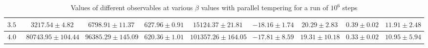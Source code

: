 \begin{sidewaystable}[t!]
\begin{tabular}{|c|c|c|c|c|c|c|c|c|}
            \hline
            $3.50$ & $3217.54 \pm 4.82$ & $6798.91 \pm 11.37$ & $627.96 \pm 0.91$ & $15124.37 \pm 21.81$ & $-18.16 \pm 1.74$ & $20.29 \pm 2.83$ & $0.39 \pm 0.02$ & $11.91 \pm 2.48$ \\
            \hline
            $4.00$ & $80743.95 \pm 104.44$ & $96385.29 \pm 145.09$ & $620.36 \pm 1.01$ & $101357.26 \pm 164.05$ & $-17.81 \pm 8.59$ & $19.31 \pm 10.18$ & $0.33 \pm 0.02$ & $10.95 \pm 5.94$ \\            \end{tabular}
            \caption{Values of different observables at various $\beta$ values with parallel tempering for a run of $10 ^6$ steps}
        \label{mmc}
        \end{sidewaystable}